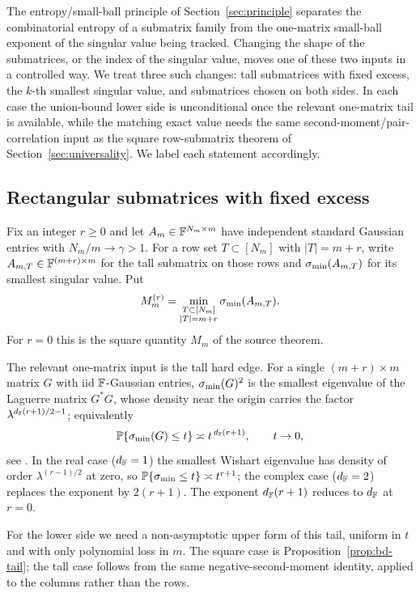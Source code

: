 The entropy/small-ball principle of Section~\ref{sec:principle} separates the
combinatorial entropy of a submatrix family from the one-matrix small-ball
exponent of the singular value being tracked.  Changing the shape of the
submatrices, or the index of the singular value, moves one of these two inputs
in a controlled way.  We treat three such changes: tall submatrices with fixed
excess, the \(k\)-th smallest singular value, and submatrices chosen on both
sides.  In each case the union-bound lower side is unconditional once the
relevant one-matrix tail is available, while the matching exact value needs the
same second-moment/pair-correlation input as the square row-submatrix theorem of
Section~\ref{sec:universality}.  We label each statement accordingly.

\subsection{Rectangular submatrices with fixed excess}

Fix an integer \(r\ge0\) and let \(A_m\in\mathbb{F}^{N_m\times m}\) have independent
standard Gaussian entries with \(N_m/m\to\gamma>1\).  For a row set
\(T\subset[N_m]\) with \(|T|=m+r\), write \(A_{m,T}\in\mathbb{F}^{(m+r)\times m}\) for the
tall submatrix on those rows and \(\sigma_{\min}(A_{m,T})\) for its smallest singular
value.  Put
\[
  M_m^{(r)}=\min_{\substack{T\subset[N_m]\\ |T|=m+r}}\sigma_{\min}(A_{m,T}).
\]
For \(r=0\) this is the square quantity \(M_m\) of the source theorem.

The relevant one-matrix input is the tall hard edge.  For a single
\((m+r)\times m\) matrix \(G\) with iid \(\mathbb{F}\)-Gaussian entries, \(\sigma_{\min}(G)^2\) is
the smallest eigenvalue of the Laguerre matrix \(G^*G\), whose density near the
origin carries the factor \(\lambda^{d_{\mathbb{F}}(r+1)/2-1}\); equivalently
\[
  \mathbb{P}\{\sigma_{\min}(G)\le t\}\asymp t^{\,d_{\mathbb{F}}(r+1)},\qquad t\to0,
\]
see \cite{Edelman1988,Forrester2010}.  In the real case (\(d_{\mathbb{F}}=1\)) the smallest
Wishart eigenvalue has density of order \(\lambda^{(r-1)/2}\) at zero, so
\(\mathbb{P}\{\sigma_{\min}\le t\}\asymp t^{r+1}\); the complex case (\(d_{\mathbb{F}}=2\)) replaces the
exponent by \(2(r+1)\).  The exponent \(d_{\mathbb{F}}(r+1)\) reduces to \(d_{\mathbb{F}}\) at
\(r=0\).

For the lower side we need a non-asymptotic upper form of this tail, uniform in
\(t\) and with only polynomial loss in \(m\).  The square case is
Proposition~\ref{prop:bd-tail}; the tall case follows from the same
negative-second-moment identity, applied to the columns rather than the rows.

